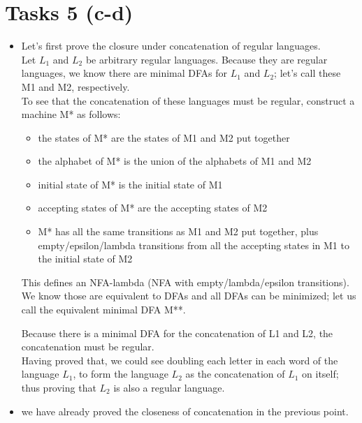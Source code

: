 \chapter{Tasks 5 (c-d)}

 \begin{itemize}
 	\item Let's first prove the closure under concatenation of regular languages.\\
 	 Let $L_1$ and $L_2$ be arbitrary regular languages. Because they are regular languages, we know there are minimal DFAs for $L_1$ and $L_2$; let's call these M1 and M2, respectively.\\
 	 
To see that the concatenation of these languages must be regular, construct a machine M* as follows:
\begin{itemize}
	\item the states of M* are the states of M1 and M2 put together
	\item the alphabet of M* is the union of the alphabets of M1 and M2
	\item initial state of M* is the initial state of M1
	\item accepting states of M* are the accepting states of M2
	\item M* has all the same transitions as M1 and M2 put together, plus empty/epsilon/lambda transitions from all the accepting states in M1 to the initial state of M2
\end{itemize}

This defines an NFA-lambda (NFA with empty/lambda/epsilon transitions). We know those are equivalent to DFAs and all DFAs can be minimized; let us call the equivalent minimal DFA M**.

Because there is a minimal DFA for the concatenation of L1 and L2, the concatenation must be regular.
\\
Having proved that, we could see doubling each letter in each word of the language $L_1$, to form the language $L_2$ as the concatenation of $L_1$ on itself; thus proving that $L_2$ is also a regular language.
\item we have already proved the closeness of concatenation in the previous point.\cite{Sipser:2006aa}

 \end{itemize}
 
 